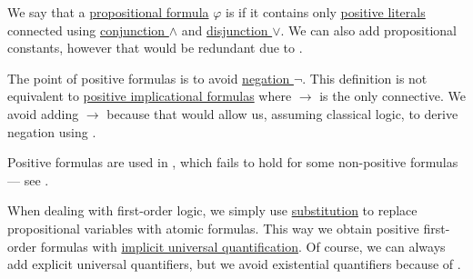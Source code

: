\begin{definition}\label{def:positive_formula}
  We say that a \hyperref[def:propositional_syntax/formula]{propositional formula} \( \varphi \) is  if it contains only \hyperref[def:cnf_and_dnf]{positive literals} connected using \hyperref[def:propositional_language/connectives/conjunction]{conjunction \( \wedge \)} and \hyperref[def:propositional_language/connectives/disjunction]{disjunction \( \vee \)}. We can also add propositional constants, however that would be redundant due to .

  The point of positive formulas is to avoid \hyperref[def:propositional_language/negation]{negation \( \neg \)}. This definition is not equivalent to \hyperref[def:positive_implicational_deductive_system]{positive implicational formulas} where \( \rightarrow \) is the only connective. We avoid adding \( \rightarrow \) because that would allow us, assuming classical logic, to derive negation using .

  Positive formulas are used in , which fails to hold for some non-positive formulas --- see .

  When dealing with first-order logic, we simply use \hyperref[thm:first_order_substitution_equivalence/propositional]{substitution} to replace propositional variables with atomic formulas. This way we obtain positive first-order formulas with \hyperref[thm:implicit_universal_quantification]{implicit universal quantification}. Of course, we can always add explicit universal quantifiers, but we avoid existential quantifiers because of .
\end{definition}

